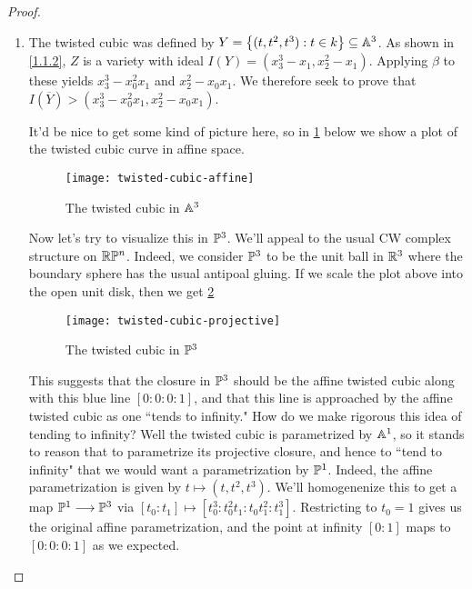 \begin{proof}
\begin{enumerate}[label= (\alph*)]
        \item The twisted cubic was defined by $Y = \curly{(t, t^2, t^3) : t \in k} \subseteq \A^3$. As shown in \ref{1.1.2}, $Z$ is a variety with ideal $I(Y) = (x_3^3 - x_1, x_2^2 - x_1)$. Applying $\beta$ to these yields $x_3^3 - x_0^2 x_1$ and $x_2^2 - x_0 x_1$. We therefore seek to prove that $I(\overline Y) > (x_3^3 - x_0^2 x_1, x_2^2 - x_0 x_1)$.

        It'd be nice to get some kind of picture here, so in \ref{fig1.2.1} below we show a plot of the twisted cubic curve in affine space.

        \begin{figure}
            \centering
            \texttt{[image: twisted-cubic-affine]}
            \caption{The twisted cubic in $\A^3$}
            \label{fig1.2.1}
        \end{figure}

        Now let's try to visualize this in $\P^3$. We'll appeal to the usual CW complex structure on $\rp^n$. Indeed, we consider $\P^3$ to be the unit ball in $\R^3$ where the boundary sphere has the usual antipoal gluing. If we scale the plot above into the open unit disk, then we get \ref{fig1.2.2}

        \begin{figure}
            \centering
            \texttt{[image: twisted-cubic-projective]}
            \caption{The twisted cubic in $\P^3$}
            \label{fig1.2.2}
        \end{figure}

        This suggests that the closure in $\P^3$ should be the affine twisted cubic along with this blue line $[0 : 0 : 0 :1]$, and that this line is approached by the affine twisted cubic as one ``tends to infinity." How do we make rigorous this idea of tending to infinity? Well the twisted cubic is parametrized by $\A^1$, so it stands to reason that to parametrize its projective closure, and hence to ``tend to infinity" that we would want a parametrization by $\P^1$. Indeed, the affine parametrization is given by $t \mapsto (t, t^2, t^3)$. We'll homogenenize this to get a map $\P^1 \longrightarrow \P^3$ via $[t_0 : t_1] \mapsto [t_0^3 : t_0^2 t_1 : t_0 t_1^2 : t_1^3]$. Restricting to $t_0 = 1$ gives us the original affine parametrization, and the point at infinity $[0 : 1]$ maps to $[0 : 0 : 0 : 1]$ as we expected.


\end{enumerate}
\end{proof}
